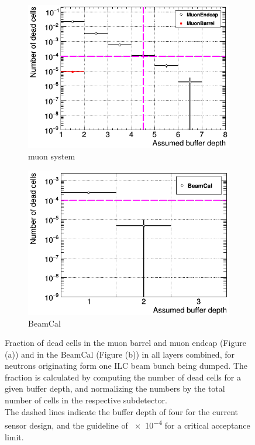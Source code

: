 \begin{figure}[!h]
 \centering
  \begin{subfigure}[b]{0.49\textwidth}
   \centering
    \includegraphics[width=\textwidth]{Figures/BeamDump/Occupancy_Comparison_All_layers_deadcells_BeamDump_Neutrons_MuonSystem.png}
   \caption{\sid muon system}
   \end{subfigure}
   \hfill
   \begin{subfigure}[b]{0.49\textwidth}
   \centering
    \includegraphics[width=\textwidth]{Figures/BeamDump/Occupancy_Comparison_All_layers_deadcells_BeamDump_Neutrons_BeamCal.png}
   \caption{\sid BeamCal}
   \end{subfigure}
   \caption[Neutron occupancy in the \sid muon system and BeamCal]{Fraction of dead cells in the \sid muon barrel and muon endcap (Figure (a)) and in the \sid BeamCal (Figure (b)) in all layers combined, for neutrons originating form one ILC beam bunch being dumped.
   The fraction is calculated by computing the number of dead cells for a given buffer depth, and normalizing the numbers by the total number of cells in the respective subdetector.
   \\The dashed lines indicate the buffer depth of four for the current sensor design, and the guideline of \num{e-4} for a critical acceptance limit.}
   \label{fig:BeamDumps:NeutronOcc}
\end{figure} 

